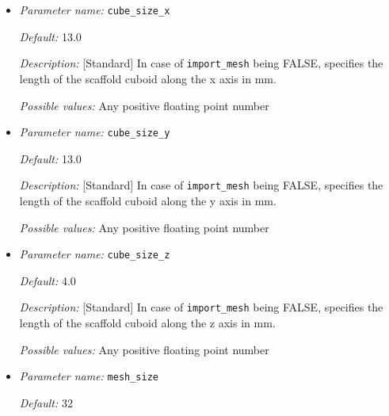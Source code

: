 \begin{itemize}
{\it Default:} 20.0

{\it Description:} [Standard] In case of {\tt import\_mesh} being FALSE, specifies the length of the container box (for the electrolyte) in mm.

{\it Possible values:} Any positive floating point number 


\item {\it Parameter name:} {\tt cube\_size\_x}
\label{parameters:cube_size_x}


{\it Default:} 13.0

{\it Description:} [Standard] In case of {\tt import\_mesh} being FALSE, specifies the length of the scaffold cuboid along the x axis in mm.

{\it Possible values:} Any positive floating point number 


\item {\it Parameter name:} {\tt cube\_size\_y}
\label{parameters:cube_size_y}


{\it Default:} 13.0

{\it Description:} [Standard] In case of {\tt import\_mesh} being FALSE, specifies the length of the scaffold cuboid along the y axis in mm.

{\it Possible values:} Any positive floating point number 


\item {\it Parameter name:} {\tt cube\_size\_z}
\label{parameters:cube_size_z}


{\it Default:} 4.0

{\it Description:} [Standard] In case of {\tt import\_mesh} being FALSE, specifies the length of the scaffold cuboid along the z axis in mm.


{\it Possible values:} Any positive floating point number 


\item {\it Parameter name:} {\tt mesh\_size}
\label{parameters:mesh_size}


{\it Default:} 32


\end{itemize}
